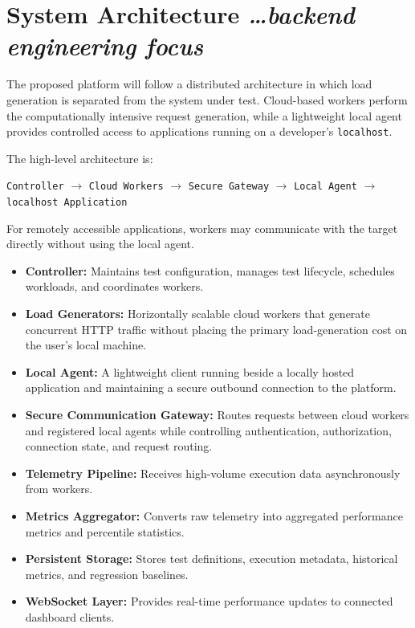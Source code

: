 \documentclass[11pt,a4paper]{article}
\newcommand{\BvrHint}[1]{%
  {\normalfont\normalsize\itshape\hfill #1}}
\begin{document}
\section{System Architecture%
  \BvrHint{\ldots backend engineering focus}}

The proposed platform will follow a distributed architecture in which
load generation is separated from the system under test. Cloud-based
workers perform the computationally intensive request generation,
while a lightweight local agent provides controlled access to
applications running on a developer's \texttt{localhost}.

The high-level architecture is:

\begin{center}
\texttt{Controller}
$\rightarrow$
\texttt{Cloud Workers}
$\rightarrow$
\texttt{Secure Gateway}
$\rightarrow$
\texttt{Local Agent}
$\rightarrow$
\texttt{localhost Application}
\end{center}

For remotely accessible applications, workers may communicate with
the target directly without using the local agent.

\begin{itemize}[leftmargin=0.7cm]

    \item \textbf{Controller:} Maintains test configuration, manages
    test lifecycle, schedules workloads, and coordinates workers.

    \item \textbf{Load Generators:} Horizontally scalable cloud
    workers that generate concurrent HTTP traffic without placing the
    primary load-generation cost on the user's local machine.

    \item \textbf{Local Agent:} A lightweight client running beside a
    locally hosted application and maintaining a secure outbound
    connection to the platform.

    \item \textbf{Secure Communication Gateway:} Routes requests
    between cloud workers and registered local agents while
    controlling authentication, authorization, connection state, and
    request routing.

    \item \textbf{Telemetry Pipeline:} Receives high-volume execution
    data asynchronously from workers.

    \item \textbf{Metrics Aggregator:} Converts raw telemetry into
    aggregated performance metrics and percentile statistics.

    \item \textbf{Persistent Storage:} Stores test definitions,
    execution metadata, historical metrics, and regression baselines.

    \item \textbf{WebSocket Layer:} Provides real-time performance
    updates to connected dashboard clients.

\end{itemize}
\end{document}
